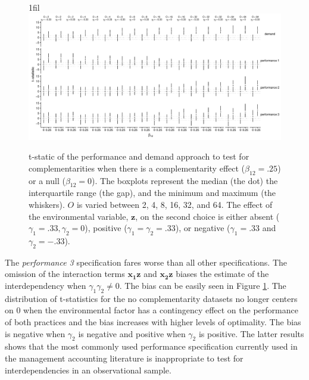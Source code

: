 \documentclass[12pt]{article}
\makeatletter
\newcommand*{\centerfloat}{%
  \parindent \z@
  \leftskip \z@ \@plus 1fil \@minus \textwidth
  \rightskip\leftskip
  \parfillskip \z@skip}
\makeatother
\begin{document}
\begin{figure}
\centerfloat
\includegraphics[width=600px]{figure-latex/main_plot.pdf}
\caption[Error Rate and Power of Demand and Performance Specification]
{\label{main} t-static of the performance and demand approach to test
for complementarities when there is a complementarity effect ($\beta_{12} = .25$)
or a null ($\beta_{12} = 0$). The boxplots represent the median (the dot) the
interquartile range (the gap), and the minimum and maximum (the whiskers). $O$
is varied between 2, 4, 8, 16, 32, and 64. The effect of the environmental
variable, $\mathbf{z}$, on the second choice is either absent 
($\gamma_1 = .33,  \gamma_2 = 0$), positive ($\gamma_1 = \gamma_2 = .33$), or negative ($\gamma_1 = .33$ and $\gamma_2 = -.33$).}
\end{figure}


The \emph{performance 3}  specification fares worse than all other specifications. The omission of the interaction terms \(\mathbf{x_1z}\) and \(\mathbf{x_2z}\) biases the estimate of the interdependency when $\gamma_1 \gamma_2 \neq 0$. The bias can be easily seen in Figure \ref{main}. The distribution of t-statistics for the no complementarity datasets no longer centers on $0$ when the environmental factor has a contingency effect on the performance of both practices and the bias increases with higher levels of optimality. The bias is negative when $\gamma_2$ is negative and positive when $\gamma_2$ is positive.  The latter results shows that the most commonly used performance specification currently used in the management accounting literature is inappropriate to test for interdependencies in an observational sample.


\end{document}
